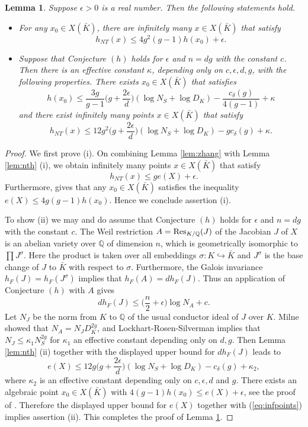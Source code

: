 \documentclass[11pt]{article}
\newtheorem{lemma}[theorem]{Lemma}
\numberwithin{equation}{section}
\newcommand {\QQ}  {{\mathbb Q}}
\begin{document}
\begin{lemma}\label{lem:conj}
Suppose $\epsilon>0$ is a real number. Then the following statements hold.
\begin{itemize}
\item[(i)] For any $x_0\in X(\bar{K})$, there are infinitely many $x\in X(\bar{K})$ that satisfy $$h_{NT}(x)\leq 4g^2(g-1)h(x_0)+\epsilon.$$
\item[(ii)] Suppose that Conjecture $(h)$ holds for $\epsilon$ and $n=dg$ with the constant $c$. Then there is an effective constant  $\kappa$, depending only on $c,\epsilon,d,g$, with the following properties. There exists $x_0\in X(\bar{K})$ that satisfies 
$$h(x_0)\leq \frac{3g}{g-1}\bigl(g+\frac{2\epsilon}{d}\bigl)(\log N_S+\log D_K)-\frac{c_\delta(g)}{4(g-1)}+\kappa$$
and there exist infinitely many points $x\in X(\bar{K})$ that satisfy $$h_{NT}(x)\leq 12g^2\bigl(g+\frac{2\epsilon}{d}\bigl)(\log N_S+\log D_K)-gc_\delta(g)+\kappa.$$
\end{itemize}
\end{lemma}

\begin{proof}
We first prove (i). On combining Lemma  \ref{lem:zhang} with Lemma \ref{lem:nth} (i), we obtain infinitely many points $x\in X(\bar{K})$ that satisfy 
\begin{equation}\label{eq:infpoints}
h_{NT}(x)\leq ge(X)+\epsilon.
\end{equation}
Furthermore, \cite[Theorem 5.b)]{faltings:arithmeticsurfaces} gives that any $x_0\in X(\bar{K})$ satisfies the inequality $e(X)\leq 4g(g-1)h(x_0)$. Hence we conclude assertion (i).

To show (ii) we may and do assume that Conjecture $(h)$ holds for $\epsilon$ and $n=dg$ with the constant $c$. The Weil restriction $A=\textnormal{Res}_{K/\QQ}(J)$ of the Jacobian $J$ of $X$ is an abelian variety over $\QQ$ of dimension $n$, which is geometrically isomorphic to $\prod J^\sigma$. Here the product is taken over all embeddings $\sigma:K\hookrightarrow \bar{K}$ and $J^\sigma$ is the base change of $J$ to $\bar{K}$ with respect to $\sigma$. 
Furthermore, the Galois invariance $h_F(J)=h_F(J^\sigma)$ implies that  $h_F(A)=dh_F(J)$. Thus an application of Conjecture $(h)$ with $A$ gives 
$$dh_F(J)\leq \bigl(\frac{n}{2}+\epsilon\bigl)\log N_A+c.$$
Let $N_J$ be the norm from $K$ to $\QQ$ of the usual conductor ideal of $J$ over $K$. 
Milne \cite[Proposition 1]{milne:arithmetic} showed that $N_A=N_JD_K^{2g}$, and Lockhart-Rosen-Silverman \cite[Theorem 0.1]{lorosi:conductor} implies that $N_J\leq \kappa_1N_S^{2g}$ for $\kappa_1$ an effective constant depending only on $d,g$. 
Then Lemma \ref{lem:nth} (ii) together with the displayed upper bound for $dh_F(J)$ leads to 
$$e(X)\leq 12g\bigl(g+\frac{2\epsilon}{d}\bigl)(\log N_S+\log D_K)-c_\delta(g)+\kappa_2,$$
where $\kappa_2$ is an effective constant depending only on $c,\epsilon,d$ and $g$. There exists an algebraic point $x_0\in X(\bar{K})$ with $4(g-1)h(x_0)\leq e(X)+\epsilon$, see the proof of \cite[Proposition 3.4]{moret-bailly:effmordell}. Therefore the  displayed upper bound for $e(X)$ together with (\ref{eq:infpoints}) implies assertion (ii). This completes the proof of Lemma \ref{lem:conj}.
\end{proof}
\end{document}
